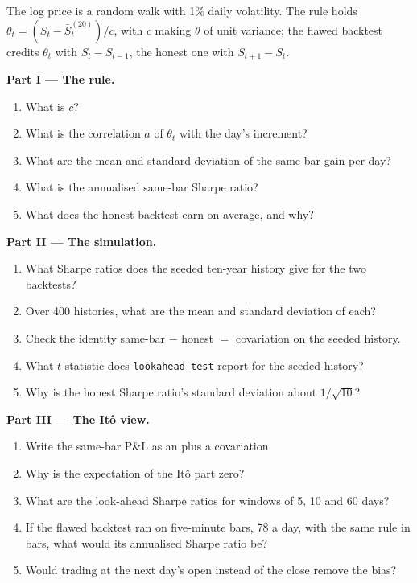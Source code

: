 \begin{problem}\label{pb:qm:ito-calculus:1}
The log price is a random walk with 1\% daily volatility. The rule holds $\theta_t = (S_t -
\bar S^{(20)}_t)/c$, with $c$ making $\theta$ of unit variance; the flawed backtest credits $\theta_t$
with $S_t - S_{t-1}$, the honest one with $S_{t+1} - S_t$.

\medskip\noindent\textbf{Part I --- The rule.}
\begin{enumerate}
\item What is $c$?
\item What is the correlation $a$ of $\theta_t$ with the day's increment?
\item What are the mean and standard deviation of the same-bar gain per day?
\item What is the annualised same-bar Sharpe ratio?
\item What does the honest backtest earn on average, and why?
\end{enumerate}

\medskip\noindent\textbf{Part II --- The simulation.}
\begin{enumerate}[resume]
\item What Sharpe ratios does the seeded ten-year history give for the two backtests?
\item Over 400 histories, what are the mean and standard deviation of each?
\item Check the identity same-bar $-$ honest $=$ covariation on the seeded history.
\item What $t$-statistic does \texttt{lookahead\_test} report for the seeded history?
\item Why is the honest Sharpe ratio's standard deviation about $1/\sqrt{10}$?
\end{enumerate}

\medskip\noindent\textbf{Part III --- The Itô view.}
\begin{enumerate}[resume]
\item Write the same-bar P\&L as an  plus a covariation.
\item Why is the expectation of the Itô part zero?
\item What are the look-ahead Sharpe ratios for windows of 5, 10 and 60 days?
\item If the flawed backtest ran on five-minute bars, 78 a day, with the same rule in bars, what would its annualised Sharpe ratio be?
\item Would trading at the next day's open instead of the close remove the bias?
\end{enumerate}


\end{problem}
